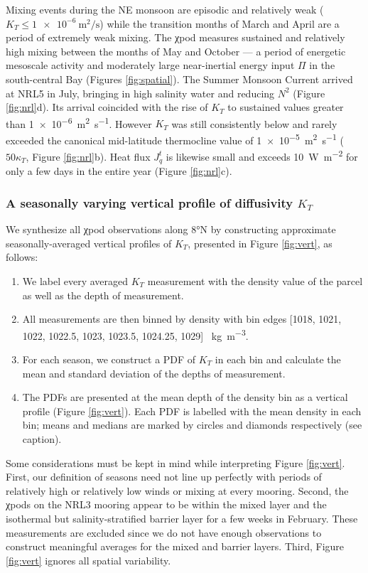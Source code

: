 \documentclass[onecol]{ametsoc}
\begin{document}
Mixing events during the NE monsoon are episodic and relatively weak ($K_T \le \SI{1e-6}{\metre\squared\per\second}$) while the transition months of March and April are a period of extremely weak mixing.
The χpod measures sustained and relatively high mixing between the months of May and October --- a period of energetic mesoscale activity and moderately large near-inertial energy input \(Π\) in the south-central Bay (Figures \ref{fig:spatial}).
The Summer Monsoon Current arrived at NRL5 in July, bringing in high salinity water and reducing \(N^2\) (Figure \ref{fig:nrl}d).
Its arrival coincided with the rise of \(K_T\) to sustained values greater than \SI{1e-6}{\meter\squared\per\second}.
However \(K_T\) was still consistently below and rarely exceeded the canonical mid-latitude thermocline value of \SI{1e-5}{\m\squared\per\s} (\(50κ_T\), Figure \ref{fig:nrl}b).
Heat flux \(J_q^t\) is likewise small and exceeds \SI{10}{\W\per\m\squared} for only a few days in the entire year (Figure \ref{fig:nrl}c).

\subsubsection*{A seasonally varying vertical profile of diffusivity \(K_T\)}
\label{sec:org56f20f8}
\label{sec:profile}

We synthesize all χpod observations along 8°N by constructing approximate seasonally-averaged vertical profiles of \(K_T\), presented in Figure \ref{fig:vert}, as follows:
\begin{enumerate}
\item We label every averaged \(K_T\) measurement with the density value of the parcel as well as the depth of measurement.
\item All measurements are then binned by density with bin edges [1018, 1021, 1022, 1022.5, 1023, 1023.5, 1024.25, 1029] \SI{}{\kg\per\m\cubed}.
\item For each season, we construct a PDF of \(K_T\) in each bin and calculate the mean and standard deviation of the depths of measurement.
\item The PDFs are presented at the mean depth of the density bin as a vertical profile (Figure \ref{fig:vert}). Each PDF is labelled with the mean density in each bin; means and medians are marked by circles and diamonds respectively (see caption).
\end{enumerate}
Some considerations must be kept in mind while interpreting Figure \ref{fig:vert}.
First, our definition of seasons need not line up perfectly with periods of relatively high or relatively low winds or mixing at every mooring.
Second, the χpods on the NRL3 mooring appear to be within the mixed layer and the isothermal but salinity-stratified barrier layer for a few weeks in February.
These measurements are excluded since we do not have enough observations to construct meaningful averages for the mixed and barrier layers.
Third, Figure \ref{fig:vert} ignores all spatial variability.
\end{document}
